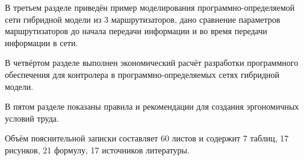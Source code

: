 В третьем разделе приведён пример моделирования программно-определяемой сети гибридной модели из 3 маршрутизаторов, дано сравнение параметров
маршрутизаторов до начала передачи информации и во время передачи информации в сети.

В четвёртом разделе выполнен экономический расчёт разработки программного
обеспечения для контролера в программно-определяемых сетях гибридной модели.

В пятом разделе показаны правила и рекомендации для создания эргономичных
условий труда.

Объём пояснительной записки составляет 60 листов и содержит
7 таблиц, 17 рисунков, 21 формулу, 17 источников литературы.
